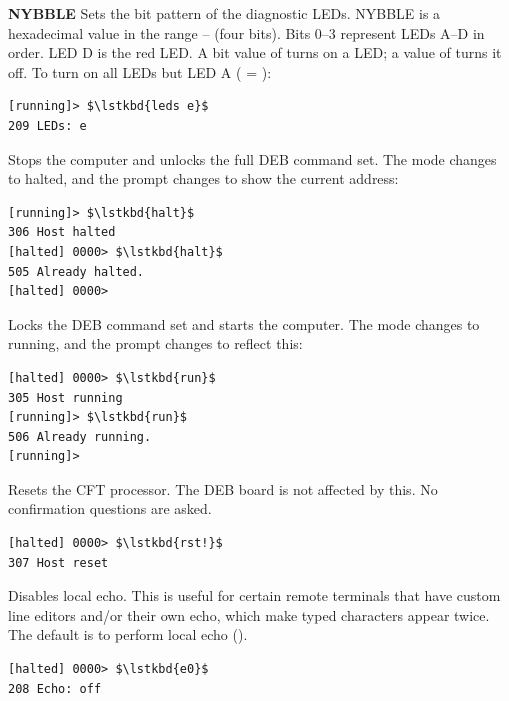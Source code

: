 \begin{description}
\item{\bfseries{} NYBBLE} Sets the bit pattern of the diagnostic
  LEDs. \gls{NYBBLE} is a hexadecimal value in the range
  – (four bits). Bits 0–3 represent LEDs A–D in order. LED D is the
  red LED. A bit value of  turns on a LED; a value of 
  turns it off. To turn on all LEDs but LED A ( = ):

{\small
\begin{lstlisting}[style=deb]
[running]> $\lstkbd{leds e}$
209 LEDs: e
\end{lstlisting}
}

\item{\bfseries{}} Stops the computer and unlocks the full \gls{DEB}
  command set. The mode changes to halted, and the prompt changes to
  show the current address:

{\small
\begin{lstlisting}[style=deb]
[running]> $\lstkbd{halt}$
306 Host halted
[halted] 0000> $\lstkbd{halt}$
505 Already halted.
[halted] 0000> 
\end{lstlisting}
}


\item{\bfseries{}} Locks the \gls{DEB} command set and starts the
  computer.  The mode changes to running, and the prompt changes to
  reflect this:

{\small
\begin{lstlisting}[style=deb]
[halted] 0000> $\lstkbd{run}$
305 Host running
[running]> $\lstkbd{run}$
506 Already running.
[running]> 
\end{lstlisting}
}


\item{\bfseries{}} Resets the CFT processor. The \gls{DEB} board is
  not affected by this. No confirmation questions are asked.

{\small
\begin{lstlisting}[style=deb]
[halted] 0000> $\lstkbd{rst!}$
307 Host reset
\end{lstlisting}
}


\item{\bfseries{}} Disables local echo. This is useful for certain
  remote terminals that have custom line editors and/or their own
  echo, which make typed characters appear twice. The default is to
  perform local echo ().

{\small
\begin{lstlisting}[style=deb]
[halted] 0000> $\lstkbd{e0}$
208 Echo: off
\end{lstlisting}
}



\end{description}
